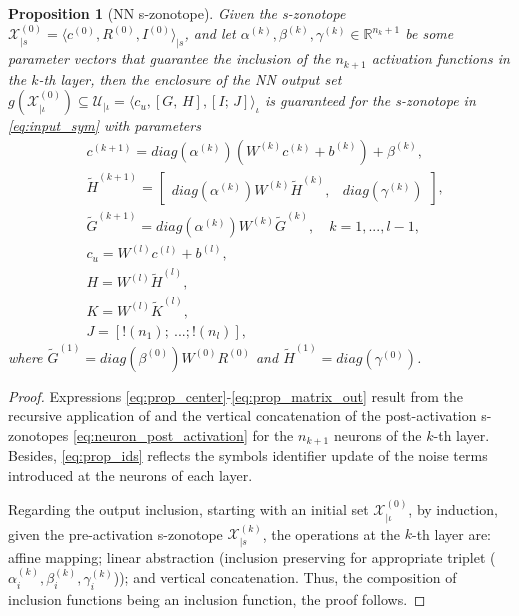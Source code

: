 \documentclass[journal]{IEEEtran}
\newtheorem{myproposition}{Proposition}
\begin{document}
\begin{myproposition}[NN s-zonotope] \label{prop:linear_abs}
Given the  s-zonotope $\mathcal{X}^{(0)}_{|s} = \langle c^{(0)}, R^{(0)}, I^{(0)}\rangle_{|s}$, and let $\alpha^{(k)}, \beta^{(k)}, \gamma^{(k)} \in \mathbb{R}^{n_k+1}$ be some parameter vectors that guarantee the inclusion of the $n_{k+1}$ activation functions in the $k$-th layer, then the enclosure of the NN output set $  g(\mathcal{X}^{(0)}_{|\iota}) \subseteq \mathcal{U}_{|\iota} = \langle c_u, [G,\, H], [I; \, J]\rangle_{\iota}$ is guaranteed for the s-zonotope in \eqref{eq:input_sym} with parameters
\begin{subequations}
\begin{align}
        &c^{(k+1)} = diag(\alpha^{(k)})(W^{(k)}c^{(k)} + b^{(k)}) + \beta^{(k)}, \label{eq:prop_center} \\
        & \tilde{H}^{(k+1)} = \begin{bmatrix}
        diag(\alpha^{(k)}) W^{(k)}\tilde{H}^{(k)}, & diag(\gamma^{(k)})
        \end{bmatrix}, \\
        &  \tilde{G}^{(k+1)} =   diag(\alpha^{(k)}) W^{(k)}\tilde{G}^{(k)}, \quad k = 1,...,l-1, \label{eq:prop_matrix} \\
        &c_u = W^{(l)}c^{(l)}+b^{(l)}, \label{eq:prop_center_out} \\
        &H = W^{(l)}\tilde{H}^{(l)},  \\
        &K = W^{(l)}\tilde{K}^{(l)}, \label{eq:prop_matrix_out} \\
        &J = [!(n_{1}); \ ...  ; !(n_{l})],   \label{eq:prop_ids} 
    \end{align}
\end{subequations}
where $\tilde{G}^{(1)} = diag(\beta^{(0)}) W^{(0)}R^{(0)}$ and $\tilde{H}^{(1)} =  diag(\gamma^{(0)})$.
\end{myproposition}

\begin{proof}
Expressions \eqref{eq:prop_center}-\eqref{eq:prop_matrix_out} result from the recursive application of   and the vertical concatenation of the  post-activation s-zonotopes \eqref{eq:neuron_post_activation} for the $n_{k+1}$ neurons of the $k$-th layer. Besides, \eqref{eq:prop_ids} reflects the symbols identifier update of the noise terms introduced at the neurons of each layer.

Regarding the output inclusion, starting with an initial set $\mathcal{X}^{(0)}_{|\iota}$, by induction, given the pre-activation s-zonotope $\mathcal{X}^{(k)}_{|s}$, the operations at the $k$-th layer are: affine mapping; linear abstraction (inclusion preserving for appropriate triplet ($\alpha_i^{(k)},\beta_i^{(k)},\gamma_i^{(k)}$)); and vertical concatenation. Thus, the composition of inclusion functions being an inclusion function, the proof follows.
\end{proof}
\end{document}
